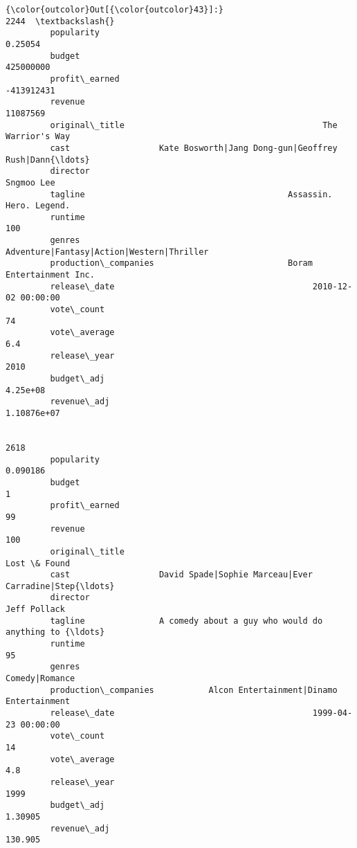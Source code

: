 \documentclass[11pt]{article}
\begin{document}
\begin{Verbatim}[commandchars=\\\{\}]
{\color{outcolor}Out[{\color{outcolor}43}]:}                                                                    2244  \textbackslash{}
         popularity                                                      0.25054   
         budget                                                        425000000   
         profit\_earned                                                -413912431   
         revenue                                                        11087569   
         original\_title                                        The Warrior's Way   
         cast                  Kate Bosworth|Jang Dong-gun|Geoffrey Rush|Dann{\ldots}   
         director                                                     Sngmoo Lee   
         tagline                                         Assassin. Hero. Legend.   
         runtime                                                             100   
         genres                        Adventure|Fantasy|Action|Western|Thriller   
         production\_companies                           Boram Entertainment Inc.   
         release\_date                                        2010-12-02 00:00:00   
         vote\_count                                                           74   
         vote\_average                                                        6.4   
         release\_year                                                       2010   
         budget\_adj                                                     4.25e+08   
         revenue\_adj                                                 1.10876e+07   
         
                                                                            2618  
         popularity                                                     0.090186  
         budget                                                                1  
         profit\_earned                                                        99  
         revenue                                                             100  
         original\_title                                             Lost \& Found  
         cast                  David Spade|Sophie Marceau|Ever Carradine|Step{\ldots}  
         director                                                   Jeff Pollack  
         tagline               A comedy about a guy who would do anything to {\ldots}  
         runtime                                                              95  
         genres                                                   Comedy|Romance  
         production\_companies           Alcon Entertainment|Dinamo Entertainment  
         release\_date                                        1999-04-23 00:00:00  
         vote\_count                                                           14  
         vote\_average                                                        4.8  
         release\_year                                                       1999  
         budget\_adj                                                      1.30905  
         revenue\_adj                                                     130.905  
\end{Verbatim}
            
\end{document}
